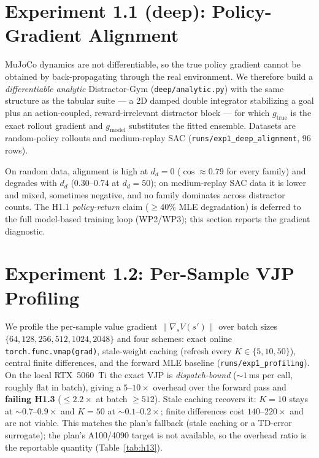 \documentclass[11pt]{article}
\begin{document}


\section{Experiment 1.1 (deep): Policy-Gradient Alignment}
\label{sec:exp11-deep}

MuJoCo dynamics are not differentiable, so the true policy gradient cannot be obtained
by back-propagating through the real environment. We therefore build a
\emph{differentiable analytic} Distractor-Gym (\texttt{deep/analytic.py}) with the same
structure as the tabular suite --- a 2D damped double integrator stabilizing a goal plus
an action-coupled, reward-irrelevant distractor block --- for which $g_{\text{true}}$ is
the exact rollout gradient and $g_{\text{model}}$ substitutes the fitted ensemble.
Datasets are random-policy rollouts and medium-replay SAC
(\texttt{runs/exp1\_deep\_alignment}, 96 rows).



On random data, alignment is high at $d_d = 0$ ($\cos \approx 0.79$ for every family)
and degrades with $d_d$ ($0.30$--$0.74$ at $d_d = 50$); on medium-replay SAC data it is
lower and mixed, sometimes negative, and no family dominates across distractor counts.
The H1.1 \emph{policy-return} claim ($\ge 40\%$ MLE degradation) is deferred to the full
model-based training loop (WP2/WP3); this section reports the gradient diagnostic.

\section{Experiment 1.2: Per-Sample VJP Profiling}
\label{sec:exp12-profiling}

We profile the per-sample value gradient $\lVert \nabla_s V(s')\rVert$ over batch sizes
$\{64, 128, 256, 512, 1024, 2048\}$ and four schemes: exact online
\texttt{torch.func.vmap(grad)}, stale-weight caching (refresh every $K \in \{5, 10, 50\}$),
central finite differences, and the forward MLE baseline
(\texttt{runs/exp1\_profiling}). On the local RTX~5060~Ti the exact VJP is
\emph{dispatch-bound} ($\sim 1$\,ms per call, roughly flat in batch), giving a
$5$--$10\times$ overhead over the forward pass and \textbf{failing H1.3} ($\le 2.2\times$
at batch $\ge 512$). Stale caching recovers it: $K = 10$ stays at $\sim 0.7$--$0.9\times$
and $K = 50$ at $\sim 0.1$--$0.2\times$; finite differences cost $140$--$220\times$ and
are not viable. This matches the plan's fallback (stale caching or a TD-error surrogate);
the plan's A100/4090 target is not available, so the overhead ratio is the reportable
quantity (Table~\ref{tab:h13}).
\end{document}
